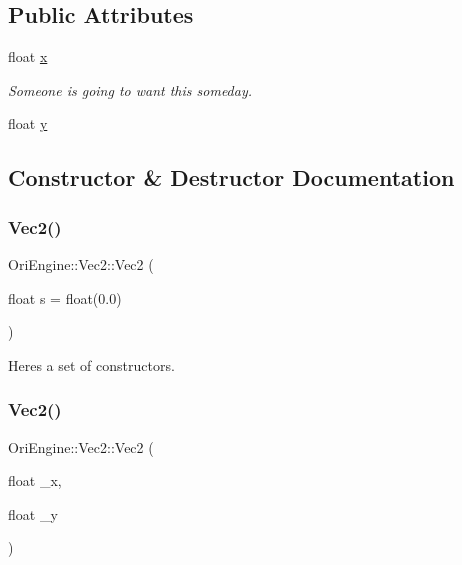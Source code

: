 \subsection*{Public Attributes}
\begin{DoxyCompactItemize}
\item 
float \hyperlink{struct_ori_engine_1_1_vec2_a03d48413df5d90b9985f677b255e7135}{x}
\begin{DoxyCompactList}\small\item\em Someone is going to want this someday. \end{DoxyCompactList}\item 
float \hyperlink{struct_ori_engine_1_1_vec2_a0fb55c74edfbbc37c84004c8cb3a18dc}{y}
\end{DoxyCompactItemize}


\subsection{Constructor \& Destructor Documentation}
\hypertarget{struct_ori_engine_1_1_vec2_a115419a0f94d31618b93c03be1117089}{}\label{struct_ori_engine_1_1_vec2_a115419a0f94d31618b93c03be1117089} 
\subsubsection{\texorpdfstring{Vec2()}{Vec2()}\hspace{0.1cm}{\footnotesize\ttfamily [1/3]}}
{\footnotesize\ttfamily Ori\+Engine\+::\+Vec2\+::\+Vec2 (\begin{DoxyParamCaption}\item[{float}]{s = {\ttfamily float(0.0)} }\end{DoxyParamCaption})\hspace{0.3cm}{\ttfamily [inline]}}



Here\textquotesingle{}s a set of constructors. 

\hypertarget{struct_ori_engine_1_1_vec2_a3f324decdc2b86e4a498a95e706f4c20}{}\label{struct_ori_engine_1_1_vec2_a3f324decdc2b86e4a498a95e706f4c20} 
\subsubsection{\texorpdfstring{Vec2()}{Vec2()}\hspace{0.1cm}{\footnotesize\ttfamily [2/3]}}
{\footnotesize\ttfamily Ori\+Engine\+::\+Vec2\+::\+Vec2 (\begin{DoxyParamCaption}\item[{float}]{\+\_\+x,  }\item[{float}]{\+\_\+y }\end{DoxyParamCaption})\hspace{0.3cm}{\ttfamily [inline]}}

